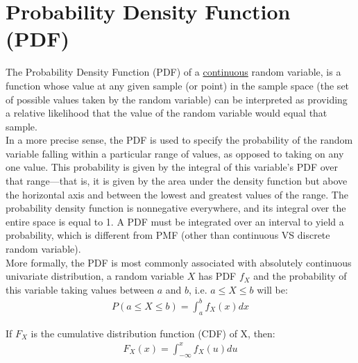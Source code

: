 \section{Probability Density Function (PDF)}

The Probability Density Function (PDF) of a \underline{continuous} random variable, is a function whose value at any given sample (or point) in the sample space (the set of possible values taken by the random variable) can be interpreted as providing a relative likelihood that the value of the random variable would equal that sample. \\

In a more precise sense, the PDF is used to specify the probability of the random variable falling within a particular range of values, as opposed to taking on any one value. This probability is given by the integral of this variable's PDF over that range—that is, it is given by the area under the density function but above the horizontal axis and between the lowest and greatest values of the range. The probability density function is nonnegative everywhere, and its integral over the entire space is equal to 1. A PDF must be integrated over an interval to yield a probability, which is different from PMF (other than continuous VS discrete random variable).\\

More formally, the PDF is most commonly associated with absolutely continuous univariate distribution, a random variable $X$ has PDF $f_X$ and the probability of this variable taking values between $a$ and $b$, i.e. $a \le X \le b$ will be:
\begin{eqnarray}
P(a \le X \le b) = \int^{b}_{a} f_X (x) dx
\label{pdf}
\end{eqnarray}

If $F_X$ is the cumulative distribution function (CDF) of X, then:
\begin{eqnarray}
F_X(x) = \int^{x}_{-\infty} f_X(u) du
\label{cdf}
\end{eqnarray}

